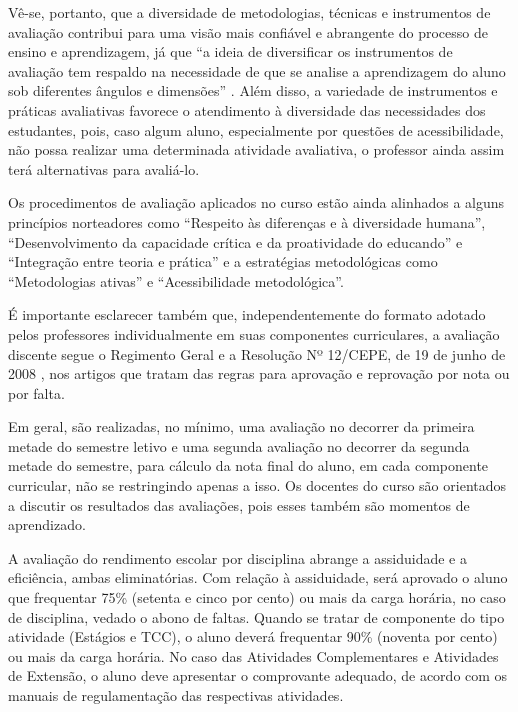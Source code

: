 Vê-se, portanto, que a diversidade de metodologias, técnicas e instrumentos de avaliação contribui para uma visão mais confiável e abrangente do processo de ensino e aprendizagem, já que “a ideia de diversificar os instrumentos de avaliação tem respaldo na necessidade de que se analise a aprendizagem do aluno sob diferentes ângulos e dimensões” \cite[p. 95]{depresbiteris2017diversificar}. Além disso, a variedade de instrumentos e práticas avaliativas favorece o atendimento à diversidade das necessidades dos estudantes, pois, caso algum aluno, especialmente por questões de acessibilidade, não possa realizar uma determinada atividade avaliativa, o professor ainda assim terá alternativas para avaliá-lo.

Os procedimentos de avaliação aplicados no curso estão ainda alinhados a alguns princípios norteadores como “Respeito às diferenças e à diversidade humana”, “Desenvolvimento da capacidade crítica e da proatividade do educando” e “Integração entre teoria e prática” e a estratégias metodológicas como “Metodologias ativas” e “Acessibilidade metodológica”.

É importante esclarecer também que, independentemente do formato adotado pelos professores individualmente em suas componentes curriculares, a avaliação discente segue o Regimento Geral \cite{ufc_regimento_geral_2019} e a Resolução Nº 12/CEPE, de 19 de junho de 2008 \cite{ufc_resolucao_12_cepe_2008}, nos artigos que tratam das regras para aprovação e reprovação por nota ou por falta.

Em geral, são realizadas, no mínimo, uma avaliação no decorrer da primeira metade do semestre letivo e uma segunda avaliação no decorrer da segunda metade do semestre, para cálculo da nota final do aluno, em cada componente curricular, não se restringindo apenas a isso. Os docentes do curso são orientados a discutir os resultados das avaliações, pois esses também são momentos de aprendizado.

A avaliação do rendimento escolar por disciplina abrange a assiduidade e a eficiência, ambas eliminatórias. Com relação à assiduidade, será aprovado o aluno que frequentar 75\% (setenta e cinco por cento) ou mais da carga horária, no caso de disciplina, vedado o abono de faltas. Quando se tratar de componente do tipo atividade (Estágios e TCC), o aluno deverá frequentar 90\% (noventa por cento) ou mais da carga horária. No caso das Atividades Complementares e Atividades de Extensão, o aluno deve apresentar o comprovante adequado, de acordo com os manuais de regulamentação das respectivas atividades.

